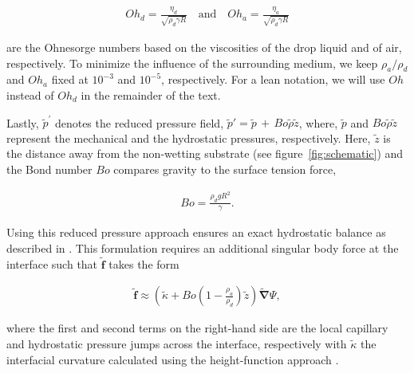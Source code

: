 \documentclass{jfm}
\newcommand{\Ohn}{\mathit{Oh}}
\newcommand{\Oha}{\mathit{Oh}_\mathit{a}}
\newcommand{\Bon}{\mathit{Bo}}
\begin{document}
\begin{align}
	\Ohn_d = \frac{\eta_d}{\sqrt{\rho_d\gamma R}} \quad \text{and} \quad \Oha = \frac{\eta_a}{\sqrt{\rho_d\gamma R}}
\end{align}

\noindent are the Ohnesorge numbers based on the viscosities of the drop liquid and of air, respectively. To minimize the influence of the surrounding medium, we keep $\rho_a/\rho_d$ and $\Oha$ fixed at $10^{-3}$ and $10^{-5}$, respectively. For a lean notation, we will use %
$\Ohn$ instead of $\Ohn_d$ in the remainder of the text. 

Lastly, $\tilde{p}^{\prime}$ denotes the reduced pressure field, $\tilde{p}' = \tilde{p}\,+\,\Bon\tilde{\rho}\tilde{z}$, where, $\tilde{p}$ and $\Bon\tilde{\rho}\tilde{z}$ represent the mechanical and the hydrostatic pressures, respectively. 
Here, $\tilde{z}$ is the distance away from the non-wetting substrate (see figure~\ref{fig:schematic}) and the Bond number $\Bon$ compares gravity to the surface tension force,

\begin{align}
	\Bon = \frac{\rho_d g R^2}{\gamma}.
\end{align}

\noindent Using this reduced pressure approach ensures an exact hydrostatic balance as described in \citet{popinet2018numerical, basiliskPopinet3}. This formulation requires an additional singular body force at the interface such that $\boldsymbol{\tilde{f}}$ takes the form \citep{brackbill1992continuum}

\begin{align}
	\boldsymbol{\tilde{f}} \approx \left(\tilde{\kappa} + \Bon\left(1 -\frac{\rho_a}{\rho_d}\right)\tilde{z}\right)\boldsymbol{\tilde{\nabla}}\Psi,
\end{align}

\noindent where the first and second terms on the right-hand side are the local capillary and hydrostatic pressure jumps across the interface, respectively with $\tilde{\kappa}$ the interfacial curvature calculated using the height-function approach \citep{popinet2009accurate}. 
\end{document}
